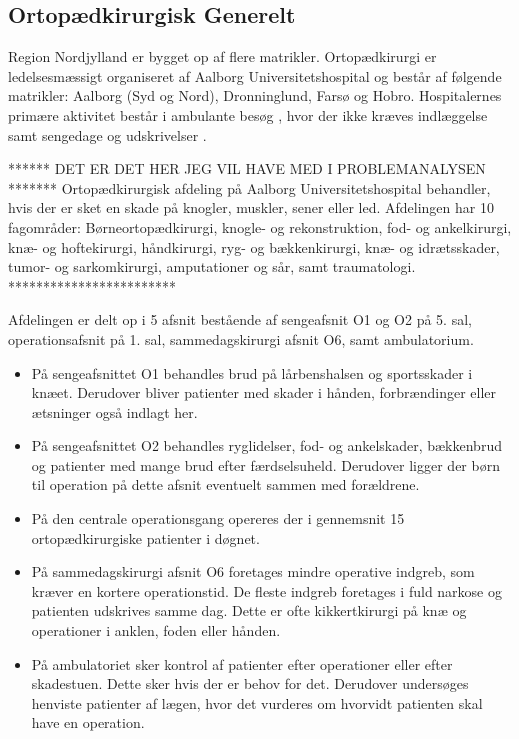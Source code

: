 \subsection{Ortopædkirurgisk Generelt}
Region Nordjylland er bygget op af flere matrikler. Ortopædkirurgi er ledelsesmæssigt organiseret af Aalborg Universitetshospital og består af følgende matrikler: Aalborg (Syd og Nord), Dronninglund, Farsø og Hobro. Hospitalernes primære aktivitet består i ambulante besøg , hvor der ikke kræves indlæggelse samt sengedage  og udskrivelser  \cite{RegionNord2016}. 

****** DET ER DET HER JEG VIL HAVE MED I PROBLEMANALYSEN *******
Ortopædkirurgisk afdeling på Aalborg Universitetshospital behandler, hvis der er sket en skade  på knogler, muskler, sener eller led. Afdelingen har 10 fagområder: Børneortopædkirurgi, knogle- og rekonstruktion, fod- og ankelkirurgi, knæ- og hoftekirurgi, håndkirurgi, ryg- og bækkenkirurgi, knæ- og idrætsskader, tumor- og sarkomkirurgi, amputationer og sår, samt traumatologi.
************************


Afdelingen er delt op i 5 afsnit bestående af sengeafsnit O1 og O2 på 5. sal, operationsafsnit på 1. sal, sammedagskirurgi afsnit O6, samt ambulatorium.  \cite{Aalborg2016}

\begin{itemize}
\item På sengeafsnittet O1 behandles brud på lårbenshalsen og sportsskader i knæet. Derudover bliver patienter med skader i hånden, forbrændinger eller ætsninger også indlagt her.
\item På sengeafsnittet O2 behandles ryglidelser, fod- og ankelskader, bækkenbrud og patienter med mange brud efter færdselsuheld. Derudover ligger der børn til operation på dette afsnit eventuelt sammen med forældrene. 
\item På den centrale operationsgang opereres der i gennemsnit 15 ortopædkirurgiske patienter i døgnet. 
\item På sammedagskirurgi afsnit O6 foretages mindre operative indgreb, som kræver en kortere operationstid. De fleste indgreb foretages i fuld narkose og patienten udskrives samme dag. Dette er ofte kikkertkirurgi på knæ og operationer i anklen, foden eller hånden. 
\item På ambulatoriet sker kontrol af patienter efter operationer eller efter skadestuen. Dette sker hvis der er behov for det. Derudover undersøges henviste patienter af lægen, hvor det vurderes om hvorvidt patienten skal have en operation. \cite{Aalborg2016}
\end{itemize}

